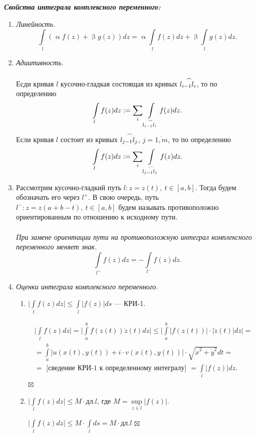 \documentclass[a4paper, 12pt]{article}
\newenvironment{Proof} %
{\par\noindent{$\blacklozenge$}} %
{\hfill$\scriptstyle\boxtimes$}
\renewcommand{\leq}{\leqslant}
\renewcommand{\alpha}{\upalpha}
\renewcommand{\beta}{\upbeta}
\newcommand{\intab}{\int\limits_a^b}
\newcommand{\intl}{\int\limits_l}
\begin{document}
\textbf{\textit{Свойства интеграла комплексного переменного:}}\begin{enumerate}
	\item \textit{Линейность.}
	$$\int\limits_l (\alpha f(z) + \beta g(z))dz = \alpha \intl f(z)dz + \beta \intl g(z)dz.$$
	\item \textit{Адиитивность.}\\\\
	Есди кривая $l$ кусочно-гладкая состоящая из кривых $\buildrel\,\,\frown\over{l_{i-1}l_i}$, то по определению $$\intl f(z)dz := \sum\limits_i\int\limits_{\buildrel\,\,\frown\over{l_{i-1}l_i}}f(z)dz.$$
	Если кривая $l$ состоит из кривых $\buildrel\,\,\frown\over{l_{j-1}l_j}$, $j = \overline{1,m}$, то по определению $$\intl f(z)dz := \sum\limits_i\int\limits_{\buildrel\,\,\frown\over{l_{j-1}l_j}}f(z)dz.$$
	\item Рассмотрим кусочно-гладкий путь $l: z= z(t),\ t\in[a,b].$ Тогда будем обозначать его через $l^+$. В свою очередь, путь $l^-: z= z(a+b-t),\ t\in[a,b]$ будем называть противоположно ориентированным по отношению к исходному пути.\\\\
	\textit{При замене ориентации пути на противоположную интеграл комплексного переменного меняет знак.}
	$$\int\limits_{l^+}f(z)dz = -\int\limits_{l^-}f(z)dz.$$
	\item \textit{Оценки интеграла комплексного переменного.}\begin{enumerate}
		\item $\Big|\intl f(z)dz\Big|\leq \intl |f(z)|ds$ --- КРИ-1.
		\begin{Proof}
			\begin{multline*}
				\Big|\intl f(z)dz\Big| = \Big|\intab f(z(t))\dot z (t)dz\Big|\leq \Big|\intab |f(z(t))|\cdot |\dot z (t)|dz\Big| =\\= \intab |u(x(t),y(t)) + i \cdot v(x(t),y(t))|\cdot \sqrt{\dot x^2 + \dot y^2}dt=\\ =\text{ [сведение КРИ-1 к определенному интегралу] } = \intl|f(z)|dz.
			\end{multline*}
		\end{Proof}
	\item $\Big|\intl f(z)dz\Big|\leq M\cdot \text{дл.}l$, где $M=\underset{z\in l}{\sup}|f(z)|$.
	\begin{Proof}
		$\Big|\intl f(z)dz\Big|\leq M\cdot \intl ds = M\cdot \text{дл.}l$
	\end{Proof}
	\end{enumerate}
\end{enumerate}
\end{document}
